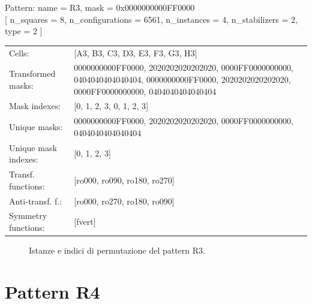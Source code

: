 \begin{tcolorbox}[sharp corners, fontupper=\ttfamily\small, colback=white]
  \noindent Pattern: name = R3, mask = 0x0000000000FF0000\\
  {[} n\_squares = 8, n\_configurations = 6561,
  n\_instances = 4, n\_stabilizers = 2, type = 2 { ]}\\[1.0ex]
  \begin{tabularx}{\textwidth}{@{} p{3.5cm} X @{}}
    Cells:               & {[}A3, B3, C3, D3, E3, F3, G3, H3{]}\\[0.5ex]
    Transformed masks:   & 0000000000FF0000, 2020202020202020, 0000FF0000000000, 0404040404040404, 0000000000FF0000, 2020202020202020, 0000FF0000000000, 0404040404040404\\[0.5ex]
    Mask indexes:        & {[}0, 1, 2, 3, 0, 1, 2, 3{]}\\[0.5ex]
    Unique masks:        & 0000000000FF0000, 2020202020202020, 0000FF0000000000, 0404040404040404\\[0.5ex]
    Unique mask indexes: & {[}0, 1, 2, 3{]}\\[0.5ex]
    Transf. functions:   & {[}ro000, ro090, ro180, ro270{]}\\[0.5ex]
    Anti-transf. f.:     & {[}ro000, ro270, ro180, ro090{]}\\[0.5ex]
    Symmetry functions:  & {[}fvert{]}\\[0.5ex]
  \end{tabularx}
\end{tcolorbox}

\begin{figure}[htbp]
  \centering
   \hfill
   \hfill
   \hfill
  \vspace{0.3cm}
   \hfill
   \hfill
   \hfill
  \caption{Istanze e indici di permutazione del pattern R3.}
\end{figure}

\newpage

\section{Pattern R4}

